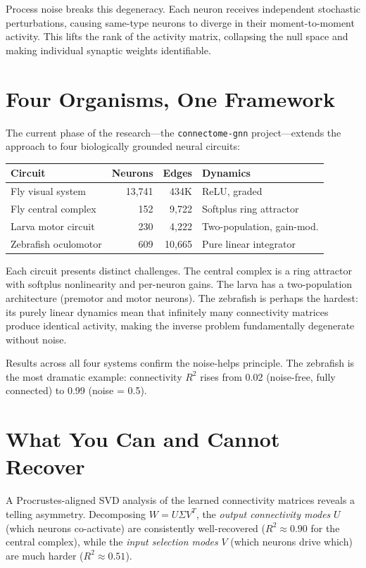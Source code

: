 \documentclass[11pt,twocolumn]{article}
\begin{document}
Process noise breaks this degeneracy. Each neuron receives independent stochastic perturbations, causing same-type neurons to diverge in their moment-to-moment activity. This lifts the rank of the activity matrix, collapsing the null space and making individual synaptic weights identifiable.

\section{Four Organisms, One Framework}

The current phase of the research---the \texttt{connectome-gnn} project---extends the approach to four biologically grounded neural circuits:

\begin{table}[h!]
\centering
\small
\begin{tabular}{@{}lrrp{2.8cm}@{}}
\toprule
\textbf{Circuit} & \textbf{Neurons} & \textbf{Edges} & \textbf{Dynamics} \\
\midrule
Fly visual system & 13,741 & 434K & ReLU, graded \\
Fly central complex & 152 & 9,722 & Softplus ring attractor \\
Larva motor circuit & 230 & 4,222 & Two-population, gain-mod. \\
Zebrafish oculomotor & 609 & 10,665 & Pure linear integrator \\
\bottomrule
\end{tabular}
\end{table}

Each circuit presents distinct challenges. The central complex is a ring attractor with softplus nonlinearity and per-neuron gains. The larva has a two-population architecture (premotor and motor neurons). The zebrafish is perhaps the hardest: its purely linear dynamics mean that infinitely many connectivity matrices produce identical activity, making the inverse problem fundamentally degenerate without noise.

Results across all four systems confirm the noise-helps principle. The zebrafish is the most dramatic example: connectivity $R^2$ rises from 0.02 (noise-free, fully connected) to 0.99 (noise = 0.5).

\section{What You Can and Cannot Recover}

A Procrustes-aligned SVD analysis of the learned connectivity matrices reveals a telling asymmetry. Decomposing $W = U \Sigma V^T$, the \emph{output connectivity modes} $U$ (which neurons co-activate) are consistently well-recovered ($R^2 \approx 0.90$ for the central complex), while the \emph{input selection modes} $V$ (which neurons drive which) are much harder ($R^2 \approx 0.51$).
\end{document}

